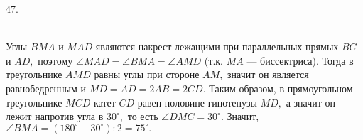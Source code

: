 47. \begin{figure}[ht!]
\end{figure}\\
Углы $BMA$ и $MAD$ являются накрест лежащими при параллельных прямых $BC$ и $AD,$ поэтому $\angle MAD=\angle BMA=\angle AMD$ (т.к. $MA$ --- биссектриса). Тогда в треугольнике $AMD$ равны углы при стороне $AM,$ значит он является равнобедренным и $MD=AD=2AB=2CD.$ Таким образом, в прямоугольном треугольнике $MCD$ катет $CD$ равен половине гипотенузы $MD,$ а значит он лежит напротив угла в $30^\circ,$ то есть $\angle DMC=30^\circ.$ Значит, $\angle BMA=(180^\circ-30^\circ):2=75^\circ.$\\
